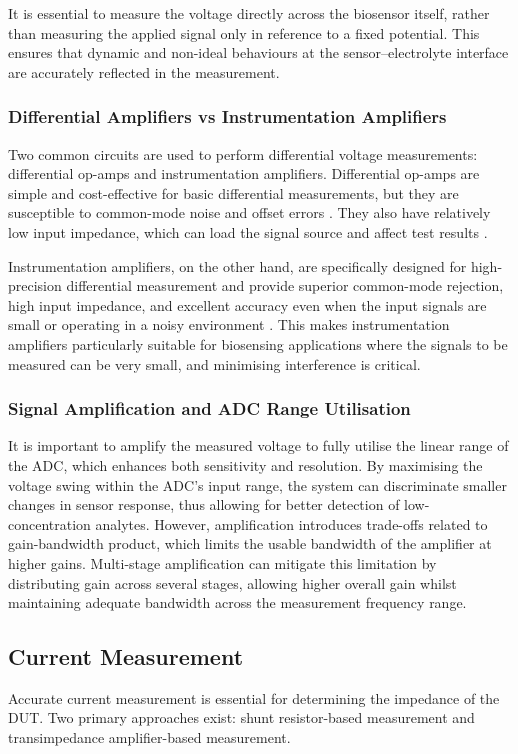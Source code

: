 It is essential to measure the voltage directly across the biosensor itself, rather than measuring the applied signal only in reference to a fixed potential. This ensures that dynamic and non-ideal behaviours at the sensor–electrolyte interface are accurately reflected in the measurement.

\subsubsection{Differential Amplifiers vs Instrumentation Amplifiers}
Two common circuits are used to perform differential voltage measurements: differential op-amps and instrumentation amplifiers. Differential op-amps are simple and cost-effective for basic differential measurements, but they are susceptible to common-mode noise and offset errors \cite{technologyWhatAreDrawbacks2024}. They also have relatively low input impedance, which can load the signal source and affect test results \cite{technologyWhatAreDrawbacks2024}. 

Instrumentation amplifiers, on the other hand, are specifically designed for high-precision differential measurement and provide superior common-mode rejection, high input impedance, and excellent accuracy even when the input signals are small or operating in a noisy environment \cite{InstrumentationAmplifierOperational}. This makes instrumentation amplifiers particularly suitable for biosensing applications where the signals to be measured can be very small, and minimising interference is critical.

\subsubsection{Signal Amplification and ADC Range Utilisation}
It is important to amplify the measured voltage to fully utilise the linear range of the \ac{ADC}, which enhances both sensitivity and resolution. By maximising the voltage swing within the \ac{ADC}'s input range, the system can discriminate smaller changes in sensor response, thus allowing for better detection of low-concentration analytes. However, amplification introduces trade-offs related to gain-bandwidth product, which limits the usable bandwidth of the amplifier at higher gains. Multi-stage amplification can mitigate this limitation by distributing gain across several stages, allowing higher overall gain whilst maintaining adequate bandwidth across the measurement frequency range.

\subsection{Current Measurement}
Accurate current measurement is essential for determining the impedance of the \ac{DUT}. Two primary approaches exist: shunt resistor-based measurement and transimpedance amplifier-based measurement.

